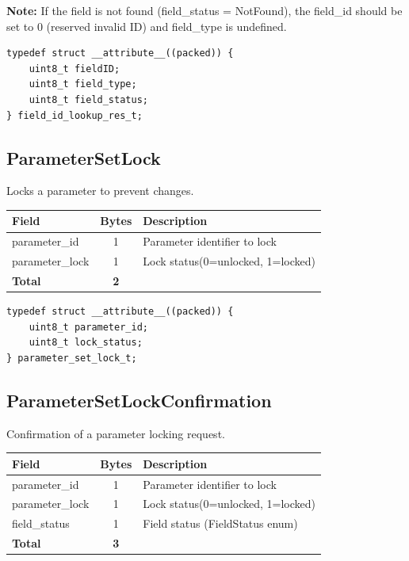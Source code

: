 \textbf{Note:} If the field is not found (field\_status = NotFound), the field\_id should be set to 0 (reserved invalid ID) and field\_type is undefined.


\begin{lstlisting}[caption={FieldIDLookupRes struct}]
typedef struct __attribute__((packed)) {
    uint8_t fieldID;
    uint8_t field_type;
    uint8_t field_status;
} field_id_lookup_res_t;
\end{lstlisting}

\subsection{ParameterSetLock}\label{struct:ParameterSetLock}
Locks a parameter to prevent changes.

\begin{center}
\begin{tabular}{l c l}
\toprule
Field & Bytes & Description \\
\midrule
parameter\_id & 1 & Parameter identifier to lock \\
parameter\_lock & 1 & Lock status(0=unlocked, 1=locked) \\
\midrule
\textbf{Total} & \textbf{2} & \\
\bottomrule
\end{tabular}
\end{center}


\begin{lstlisting}[caption={ParameterSetLock struct}]
typedef struct __attribute__((packed)) {
    uint8_t parameter_id;
    uint8_t lock_status;
} parameter_set_lock_t;
\end{lstlisting}

\subsection{ParameterSetLockConfirmation}\label{struct:ParameterSetLockConfirmation}
Confirmation of a parameter locking request.

\begin{center}
\begin{tabular}{l c l}
\toprule
Field & Bytes & Description \\
\midrule
parameter\_id & 1 & Parameter identifier to lock \\
parameter\_lock & 1 & Lock status(0=unlocked, 1=locked) \\
field\_status & 1 & Field status (FieldStatus enum) \\
\midrule
\textbf{Total} & \textbf{3} & \\
\bottomrule
\end{tabular}
\end{center}

